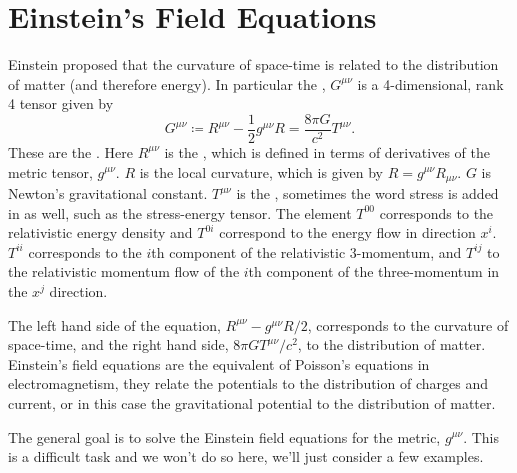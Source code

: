 \documentclass[fleqn]{NotesClass}
\begin{document}
    \section{Einstein's Field Equations}
    Einstein proposed that the curvature of space-time is related to the distribution of matter (and therefore energy).
    In particular the , \(G^{\mu\nu}\) is a 4-dimensional, rank 4 tensor given by
    \begin{equation}
        G^{\mu\nu} \coloneqq R^{\mu\nu} - \frac{1}{2}g^{\mu\nu}R = \frac{8\pi G}{c^2}T^{\mu\nu}.
    \end{equation}
    These are the .
    Here \(R^{\mu\nu}\) is the , which is defined in terms of derivatives of the metric tensor, \(g^{\mu\nu}\).
    \(R\) is the local curvature, which is given by \(R = g^{\mu\nu}R_{\mu\nu}\).
    \(G\) is Newton's gravitational constant.
    \(T^{\mu\nu}\) is the , sometimes the word stress is added in as well, such as the stress-energy tensor.
    The element \(T^{00}\) corresponds to the relativistic energy density and \(T^{0i}\) correspond to the energy flow in direction \(x^i\).
    \(T^{ii}\) corresponds to the \(i\)th component of the relativistic 3-momentum, and \(T^{ij}\) to the relativistic momentum flow of the \(i\)th component of the three-momentum in the \(x^j\) direction.
    
    The left hand side of the equation, \(R^{\mu\nu} - g^{\mu\nu}R/2\), corresponds to the curvature of space-time, and the right hand side, \(8\pi GT^{\mu\nu}/c^2\), to the distribution of matter.
    Einstein's field equations are the equivalent of Poisson's equations in electromagnetism, they relate the potentials to the distribution of charges and current, or in this case the gravitational potential to the distribution of matter.
    
    The general goal is to solve the Einstein field equations for the metric, \(g^{\mu\nu}\).
    This is a difficult task and we won't do so here, we'll just consider a few examples.
    
\end{document}
